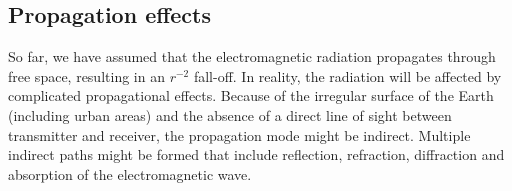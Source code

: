 \documentclass[useAMS,usenatbib]{mn2e}
\begin{document}

\subsection{Propagation effects}
So far, we have assumed that the electromagnetic radiation propagates through free space, resulting in an $r^{-2}$ fall-off. In reality, the radiation will be affected by complicated propagational effects. Because of the irregular surface of the Earth (including urban areas) and the absence of a direct line of sight between transmitter and receiver, the propagation mode might be indirect. Multiple indirect paths might be formed that include reflection, refraction, diffraction and absorption of the electromagnetic wave. 
\end{document}
